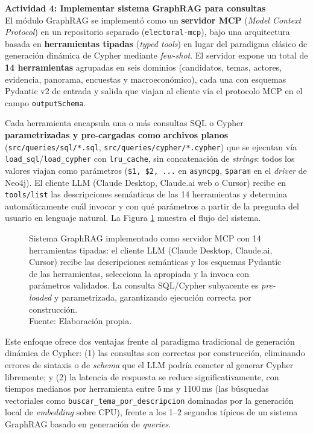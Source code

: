 \textbf{Actividad 4: Implementar sistema GraphRAG para consultas}
\\
El módulo GraphRAG se implementó como un \textbf{servidor MCP}
(\textit{Model Context Protocol}) en un repositorio separado
(\texttt{electoral-mcp}), bajo una arquitectura basada en \textbf{herramientas
tipadas} (\textit{typed tools}) en lugar del paradigma clásico de generación
dinámica de Cypher mediante \textit{few-shot}. El servidor expone un total de
\textbf{14 herramientas} agrupadas en seis dominios (candidatos, temas, actores,
evidencia, panorama, encuestas y macroeconómico), cada una con esquemas Pydantic
v2 de entrada y salida que viajan al cliente vía el protocolo MCP en el campo
\texttt{outputSchema}.

Cada herramienta encapsula una o más consultas SQL o Cypher \textbf{parametrizadas
y pre-cargadas como archivos planos}
(\texttt{src/queries/sql/*.sql}, \texttt{src/queries/cypher/*.cypher}) que se
ejecutan vía \texttt{load\_sql}/\texttt{load\_cypher} con \texttt{lru\_cache}, sin
concatenación de \textit{strings}: todos los valores viajan como parámetros
(\texttt{\$1, \$2, ...} en \texttt{asyncpg}, \texttt{\$param} en el \textit{driver}
de Neo4j). El cliente LLM (Claude Desktop, Claude.ai web o Cursor) recibe en
\texttt{tools/list} las descripciones semánticas de las 14 herramientas y
determina automáticamente cuál invocar y con qué parámetros a partir de la
pregunta del usuario en lenguaje natural. La Figura \ref{5:fig22} muestra el
flujo del sistema.

\begin{figure}[!ht]
    \begin{center}
        \resizebox{0.85\textwidth}{!}{}
        \caption[Sistema GraphRAG basado en herramientas tipadas sobre protocolo MCP]{Sistema GraphRAG implementado como servidor MCP con 14 herramientas tipadas: el cliente LLM (Claude Desktop, Claude.ai, Cursor) recibe las descripciones semánticas y los esquemas Pydantic de las herramientas, selecciona la apropiada y la invoca con parámetros validados. La consulta SQL/Cypher subyacente es \textit{pre-loaded} y parametrizada, garantizando ejecución correcta por construcción.\\
            Fuente: Elaboración propia.}
        \label{5:fig22}
    \end{center}
\end{figure}

Este enfoque ofrece dos ventajas frente al paradigma tradicional de generación
dinámica de Cypher: (1) las consultas son correctas por construcción, eliminando
errores de sintaxis o de \textit{schema} que el LLM podría cometer al generar
Cypher libremente; y (2) la latencia de respuesta se reduce significativamente,
con tiempos medianos por herramienta entre 5\,ms y 1100\,ms (las búsquedas
vectoriales como \texttt{buscar\_tema\_por\_descripcion} dominadas por la
generación local de \textit{embedding} sobre CPU), frente a los 1--2 segundos
típicos de un sistema GraphRAG basado en generación de \textit{queries}.

